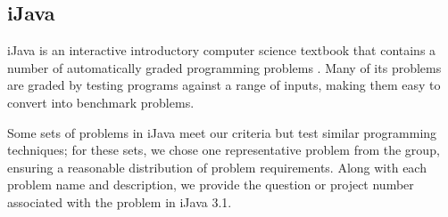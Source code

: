 \documentclass{sig-alternate}
\begin{document}
\subsection{iJava}


iJava is an interactive introductory computer science textbook that contains a number of automatically graded programming problems \cite{iJava}. %
 Many of its problems are graded by testing programs against a range of inputs, making them easy to convert into benchmark problems.


Some sets of problems in iJava meet our criteria but test similar programming techniques; for these sets, we chose one representative problem from the group, ensuring a reasonable distribution of problem requirements. Along with each problem name and description, we provide the question or project number associated with the problem in iJava 3.1.
\end{document}
